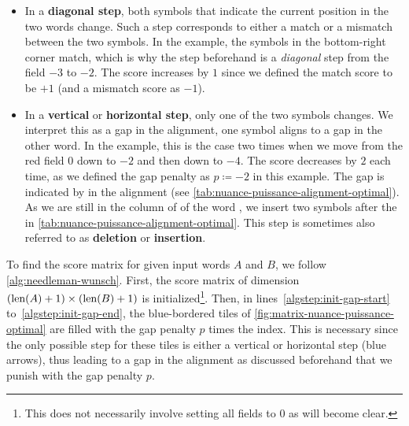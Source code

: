 \begin{itemize}

    \item In a \textbf{diagonal step}, both symbols that indicate the current position in the two words change. Such a step corresponds to either a match or a mismatch between the two symbols. In the example, the  symbols in the bottom-right corner match, which is why the step beforehand is a \textit{diagonal} step from the field $-3$ to $-2$. The score increases by $1$ since we defined the match score to be $+1$ (and a mismatch score as $-1$).

    \item In a \textbf{vertical} or \textbf{horizontal step}, only one of the two symbols changes. We interpret this as a gap in the alignment, \ie one symbol aligns to a gap in the other word. In the example, this is the case two times when we move from the red field $0$ down to $-2$ and then down to $-4$. The score decreases by $2$ each time, as we defined the gap penalty as $p \coloneqq -2$ in this example. The gap is indicated by \q{--} in the alignment (see \autoref{tab:nuance-puissance-alignment-optimal}). As we are still in the column of \textipa{/\textturnh/} of the word , we insert two \q{--} symbols after the \textipa{/\textturnh/} in \autoref{tab:nuance-puissance-alignment-optimal}. This step is sometimes also referred to as \textbf{deletion} or \textbf{insertion}.
    
\end{itemize}

To find the score matrix for given input words $A$ and $B$, we follow \autoref{alg:needleman-wunsch}. First, the score matrix of dimension $(\text{len}(A)+1) \times (\text{len}(B)+1)$ is initialized\footnote{This does not necessarily involve setting all fields to $0$ as will become clear.}. Then, in lines~\ref{algstep:init-gap-start} to~\ref{algstep:init-gap-end}, the blue-bordered tiles of \autoref{fig:matrix-nuance-puissance-optimal} are filled with the gap penalty $p$ times the index. This is necessary since the only possible step for these tiles is either a vertical or horizontal step (blue arrows), thus leading to a gap in the alignment as discussed beforehand that we punish with the gap penalty $p$.

